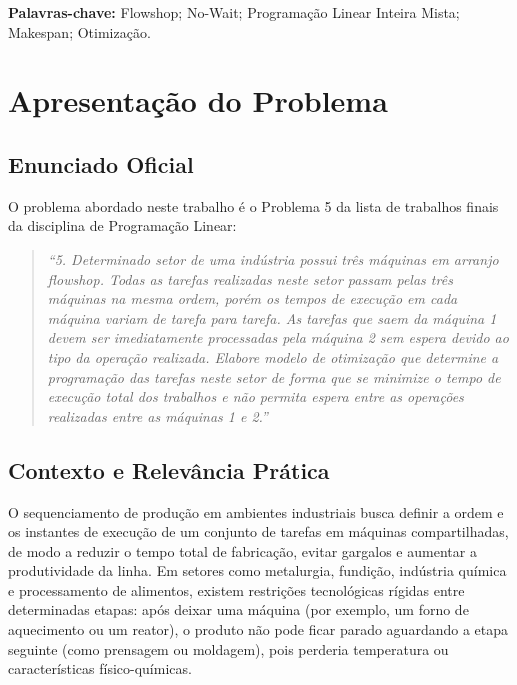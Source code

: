 \documentclass[11pt,a4paper]{article}
\begin{document}
\vspace{0.3em}
\noindent\textbf{Palavras-chave:} Flowshop; No-Wait; Programação Linear Inteira Mista; Makespan; Otimização.

\vspace{1.0em}

\section{Apresentação do Problema}
\label{sec:apresentacao}

\subsection{Enunciado Oficial}
O problema abordado neste trabalho é o Problema 5 da lista de trabalhos finais da disciplina de Programação Linear:

\begin{quote}
\textit{``5. Determinado setor de uma indústria possui três máquinas em arranjo flowshop. Todas as tarefas realizadas neste setor passam pelas três máquinas na mesma ordem, porém os tempos de execução em cada máquina variam de tarefa para tarefa. As tarefas que saem da máquina 1 devem ser imediatamente processadas pela máquina 2 sem espera devido ao tipo da operação realizada. Elabore modelo de otimização que determine a programação das tarefas neste setor de forma que se minimize o tempo de execução total dos trabalhos e não permita espera entre as operações realizadas entre as máquinas 1 e 2.''}
\end{quote}

\subsection{Contexto e Relevância Prática}
O sequenciamento de produção em ambientes industriais busca definir a ordem e os instantes de execução de um conjunto de tarefas em máquinas compartilhadas, de modo a reduzir o tempo total de fabricação, evitar gargalos e aumentar a produtividade da linha. Em setores como metalurgia, fundição, indústria química e processamento de alimentos, existem restrições tecnológicas rígidas entre determinadas etapas: após deixar uma máquina (por exemplo, um forno de aquecimento ou um reator), o produto não pode ficar parado aguardando a etapa seguinte (como prensagem ou moldagem), pois perderia temperatura ou características físico-químicas.
\end{document}
